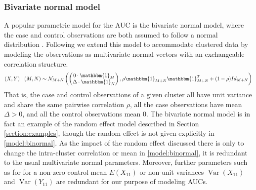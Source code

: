 \documentclass[12pt]{article}
\DeclareMathOperator{\V}{Var}
\DeclareMathOperator{\corr}{Corr}
\newcommand{\E}{E}
\newcommand{\comment}[1]{
  \iftoggle{commenttoggle}{
    {\normalsize{\color{red}{ #1}}\normalsize}
  }
  {}
}
\begin{document}
\subsubsection{Bivariate normal model}
A popular parametric model for the AUC is the bivariate normal model, where
the case and control observations are both assumed to follow a normal
distribution \citep{hanley1988}. Following \cite{obuchowski1997} we
extend this model to accommodate clustered data by modeling the
observations as multivariate normal vectors with an exchangeable
correlation structure.
\begin{align}
  (X,Y) \mid (M,N) \sim \mathcal{N}_{M+N}\left(
    \begin{pmatrix}0\cdot\mathbbm{1}_M\\ \Delta\cdot\mathbbm{1}_N\end{pmatrix},
  \rho\mathbbm{1}_{M+N}\mathbbm{1}_{M+N}^T + (1-\rho)Id_{M+N}
  \right)\label{model:binormal}
\end{align}
That is, the case and control observations of a given cluster all have
unit variance and share the same pairwise correlation $\rho$, all the case observations have mean $\Delta>0$,
and all the control observations mean $0$. The bivariate normal model is in fact an
example of the random effect model described in Section
\ref{section:examples}, though the random effect is not given explicitly in \eqref{model:binormal}. As the impact of the random effect discussed there is only to
change the intra-cluster correlation or mean in \eqref{model:binormal}, it is redundant
to the usual multivariate normal parameters. %
Moreover, further parameters such as for %
for a non-zero control mean $\E(X_{11})$ or non-unit
variances $\V(X_{11})$ and $\V(Y_{11})$ are
redundant for our purpose of modeling AUCs.%
\end{document}
